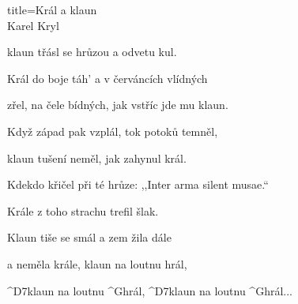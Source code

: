 \begin{song}{title=\predtitle\centering Král a klaun \\\large Karel Kryl  \vspace*{-0.8cm}}
\begin{centerjustified}
	klaun třásl se hrůzou a odvetu kul.

\sloka
	Král do boje táh' a v červáncích vlídných

	zřel, na čele bídných, jak vstříc jde mu klaun.

	Když západ pak vzplál, tok potoků temněl,

	klaun tušení neměl, jak zahynul král.

	Kdekdo křičel při té hrůze: ,,Inter arma silent musae.``

	Krále z toho strachu trefil šlak.

	Klaun tiše se smál a zem žila dále
	
	a neměla krále, klaun na loutnu hrál,

	^{D7}klaun na loutnu ^{G}hrál, ^{D7}klaun na loutnu ^{G}hrál\elipsa.\elipsa.\elipsa.

\end{centerjustified}
\setcounter{Slokočet}{0}
\end{song}
